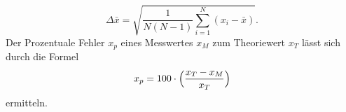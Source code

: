  \begin{equation}
     \Delta\bar{x}=\sqrt{\frac{1}{N(N-1)}\sum_{i=1}^N (x_i-\bar{x})}.
 \end{equation}
\noindent Der Prozentuale Fehler $x_p$ eines
Messwertes $x_M$ zum Theoriewert $x_T$ lässt sich durch
die Formel
\begin{equation}
    x_p=100 \cdot \Bigl(\frac{x_T-x_M}{x_T}\Bigr)
\end{equation}
\noindent ermitteln.
